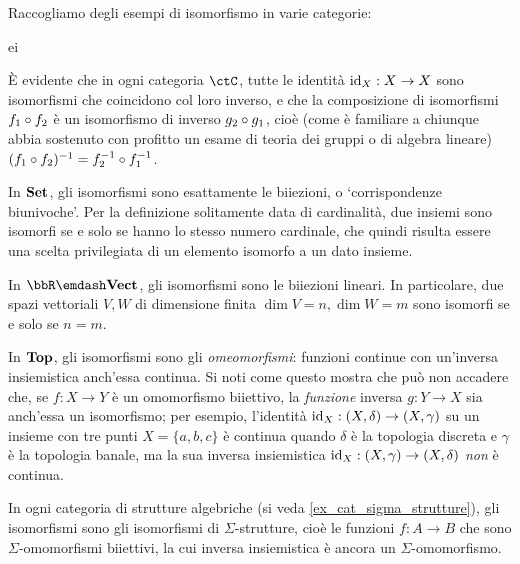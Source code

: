 \begin{examples}
	Raccogliamo degli esempi di isomorfismo in varie categorie:%
	\begin{enumtag}{ei}
		\item \`E evidente che in ogni categoria \(\ctC\), tutte le identità \(\mathrm{id}_X : X\to X\) sono isomorfismi che coincidono col loro inverso, e che la composizione di isomorfismi \(f_1\circ f_2\) è un isomorfismo di inverso \(g_2\circ g_1\), cioè (come è familiare a chiunque abbia sostenuto con profitto un esame di teoria dei gruppi o di algebra lineare) \((f_1\circ f_2)^{-1} = f_2^{-1}\circ f_1^{-1}\).
		\item In \(\mathbf{Set}\), gli isomorfismi sono esattamente le biiezioni, o `corrispondenze biunivoche'. Per la definizione solitamente data di cardinalità, due insiemi sono isomorfi se e solo se hanno lo stesso numero cardinale, che quindi risulta essere una scelta privilegiata di un elemento isomorfo a un dato insieme.
		\item In \(\bbR\emdash\ctVect\), gli isomorfismi sono le biiezioni lineari. In particolare, due spazi vettoriali \(V,W\) di dimensione finita \(\dim V=n,\dim W=m\) sono isomorfi se e solo se \(n=m\).
		\item In \(\mathbf{Top}\), gli isomorfismi sono gli \emph{omeomorfismi}: funzioni continue con un'inversa insiemistica anch'essa continua. Si noti come questo mostra che può non accadere che, se \(f : X\to Y\) è un omomorfismo biiettivo, la \emph{funzione} inversa \(g : Y\to X\) sia anch'essa un isomorfismo; per esempio, l'identità \(\mathrm{id}_X : (X,\delta)\to (X,\gamma)\) su un insieme con tre punti \(X=\{a,b,c\}\) è continua quando \(\delta\) è la topologia discreta e \(\gamma\) è la topologia banale, ma la sua inversa insiemistica \(\mathrm{id}_X : (X,\gamma)\to(X,\delta)\) \emph{non} è continua.
		\item In ogni categoria di strutture algebriche (si veda \ref{ex_cat_sigma_strutture}), gli isomorfismi sono gli isomorfismi di \(\Sigma\)-strutture, cioè le funzioni \(f : A\to B\) che sono \(\Sigma\)-omomorfismi biiettivi, la cui inversa insiemistica è ancora un \(\Sigma\)-omomorfismo.
	\end{enumtag}
\end{examples}
